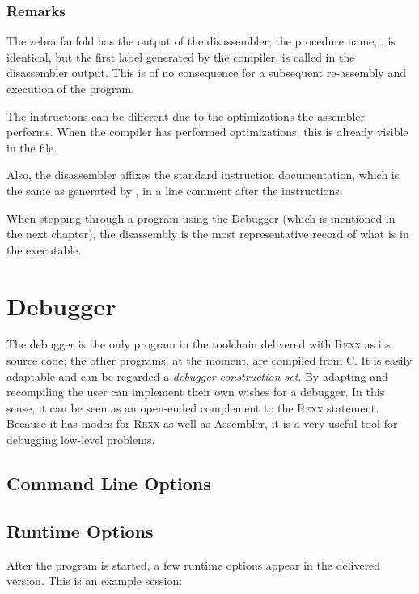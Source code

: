 \fussy
 \subsection{Remarks}
 The zebra fanfold has the output of the disassembler; the procedure name,
 , is identical, but the first label generated by the
 compiler,  is called  in the disassembler
 output. This is of no consequence for a subsequent re-assembly and
 execution of the program.

 The instructions can be different due to the optimizations the
 assembler performs. When the compiler has performed optimizations,
 this is already visible in the  file.

Also, the disassembler affixes the standard instruction documentation,
which is the same as generated by , in a line comment
after the instructions. 
 
 When stepping through a program using the \crexx{} Debugger (which is
 mentioned in the next chapter), the disassembly is the most
 representative record of what is in the  executable. 

\chapter{\crexx{} Debugger}\label{debugger}
The debugger is the only program in the toolchain delivered with \textsc{Rexx}
as its source code; the other programs, at the moment, are compiled
from C. It is easily adaptable and can be regarded a \emph{debugger
  construction set}. By adapting and recompiling the user can
implement their own wishes for a debugger. In this sense, it can be
seen as an open-ended complement to the \textsc{Rexx} 
statement. Because it has modes for \textsc{Rexx} as well as
 Assembler, it is a very useful tool for debugging
low-level problems.
\section{Command Line Options}
\begin{shaded}
  \small
  \obeylines {}
 \end{shaded}
\section{Runtime Options}
After the  program is started, a few runtime options appear in the
delivered version. This is an example session:
